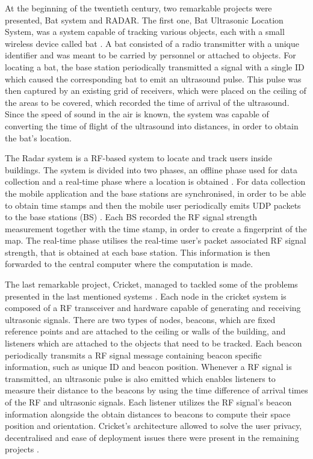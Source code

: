 \documentclass[a4paper]{IEEEtran}
\begin{document}
 
At the beginning of the twentieth century, two remarkable projects were presented, Bat system \cite{bat} and RADAR\cite{radar}. The first one, Bat Ultrasonic Location System, was a system capable of tracking various objects, each with a small wireless device called bat \cite{bat1, bat2}. A bat consisted of a radio transmitter with a unique identifier and was meant to be carried by personnel or attached to objects. For locating a bat, the base station periodically transmitted a signal with a single ID which caused the corresponding bat to emit an ultrasound pulse. This pulse was then captured by an existing grid of receivers, which were placed on the ceiling of the areas to be covered, which recorded the time of arrival of the ultrasound. Since the speed of sound in the air is known, the system was capable of converting the time of flight of the ultrasound into distances, in order to obtain the bat's location. 
 
 
The Radar system is a RF-based system to locate and track users inside buildings. The system is divided into two phases, an offline phase used for data collection and a real-time phase where a location is obtained \cite{radar1}. For data collection the mobile application and the base stations are synchronised, in order to be able to obtain time stamps and then the mobile user periodically emits UDP packets to the base stations (BS) . Each BS recorded the RF signal strength measurement together with the time stamp, in order to create a fingerprint of the map.  The real-time phase utilises the real-time user's packet associated RF signal strength, that is obtained at each base station. This information is then forwarded to the central computer where the computation is made. 
 
The last remarkable project, Cricket, managed to tackled some of the problems presented in the last mentioned systems \cite{cricket1}. Each node in the cricket system is composed of a RF transceiver and hardware capable of generating and receiving ultrasonic signals. There are two types of nodes, beacons, which are fixed reference points and are attached to the ceiling or walls of the building, and listeners which are attached to the objects that need to be tracked. Each beacon periodically transmits a RF signal message containing beacon specific information, such as unique ID and beacon position. Whenever a RF signal is transmitted, an ultrasonic pulse is also emitted which enables listeners to measure their distance to the beacons by using the time difference of arrival times of the RF and ultrasonic signals. Each listener utilizes the RF signal's beacon information alongside the obtain distances to beacons to compute their space position and orientation. Cricket's architecture allowed to solve the user privacy, decentralised and ease of deployment issues there were present in the remaining projects \cite{cricket}. 
 
\end{document}
